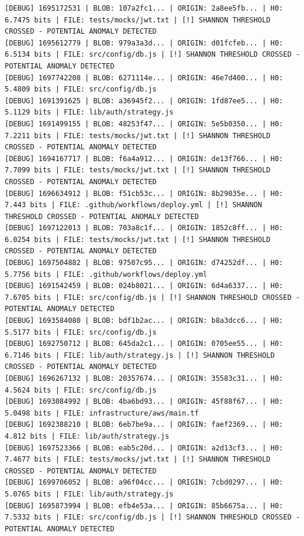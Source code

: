 \documentclass[12pt, a4paper, oneside]{report}
\begin{document}
\begin{lstlisting}[basicstyle=\tiny\ttfamily]
[DEBUG] 1695172531 | BLOB: 107a2fc1... | ORIGIN: 2a8ee5fb... | H0: 6.7475 bits | FILE: tests/mocks/jwt.txt | [!] SHANNON THRESHOLD CROSSED - POTENTIAL ANOMALY DETECTED
[DEBUG] 1695612779 | BLOB: 979a3a3d... | ORIGIN: d01fcfeb... | H0: 6.5134 bits | FILE: src/config/db.js | [!] SHANNON THRESHOLD CROSSED - POTENTIAL ANOMALY DETECTED
[DEBUG] 1697742208 | BLOB: 6271114e... | ORIGIN: 46e7d400... | H0: 5.4809 bits | FILE: src/config/db.js
[DEBUG] 1691391625 | BLOB: a36945f2... | ORIGIN: 1fd87ee5... | H0: 5.1129 bits | FILE: lib/auth/strategy.js
[DEBUG] 1691499155 | BLOB: 48253f47... | ORIGIN: 5e5b0350... | H0: 7.2211 bits | FILE: tests/mocks/jwt.txt | [!] SHANNON THRESHOLD CROSSED - POTENTIAL ANOMALY DETECTED
[DEBUG] 1694167717 | BLOB: f6a4a912... | ORIGIN: de13f766... | H0: 7.7099 bits | FILE: tests/mocks/jwt.txt | [!] SHANNON THRESHOLD CROSSED - POTENTIAL ANOMALY DETECTED
[DEBUG] 1696634912 | BLOB: f51cb53c... | ORIGIN: 8b29035e... | H0: 7.443 bits | FILE: .github/workflows/deploy.yml | [!] SHANNON THRESHOLD CROSSED - POTENTIAL ANOMALY DETECTED
[DEBUG] 1697122013 | BLOB: 703a8c1f... | ORIGIN: 1852c8ff... | H0: 6.0254 bits | FILE: tests/mocks/jwt.txt | [!] SHANNON THRESHOLD CROSSED - POTENTIAL ANOMALY DETECTED
[DEBUG] 1697504882 | BLOB: 97507c95... | ORIGIN: d74252df... | H0: 5.7756 bits | FILE: .github/workflows/deploy.yml
[DEBUG] 1691542459 | BLOB: 024b8021... | ORIGIN: 6d4a6337... | H0: 7.6705 bits | FILE: src/config/db.js | [!] SHANNON THRESHOLD CROSSED - POTENTIAL ANOMALY DETECTED
[DEBUG] 1693584080 | BLOB: bdf1b2ac... | ORIGIN: b8a3dcc6... | H0: 5.5177 bits | FILE: src/config/db.js
[DEBUG] 1692750712 | BLOB: 645da2c1... | ORIGIN: 0705ee55... | H0: 6.7146 bits | FILE: lib/auth/strategy.js | [!] SHANNON THRESHOLD CROSSED - POTENTIAL ANOMALY DETECTED
[DEBUG] 1696267132 | BLOB: 20357674... | ORIGIN: 35583c31... | H0: 4.5624 bits | FILE: src/config/db.js
[DEBUG] 1693084992 | BLOB: 4ba6bd93... | ORIGIN: 45f88f67... | H0: 5.0498 bits | FILE: infrastructure/aws/main.tf
[DEBUG] 1692388210 | BLOB: 6eb7be9a... | ORIGIN: faef2369... | H0: 4.812 bits | FILE: lib/auth/strategy.js
[DEBUG] 1697523366 | BLOB: eab5c20d... | ORIGIN: a2d13cf3... | H0: 7.4677 bits | FILE: tests/mocks/jwt.txt | [!] SHANNON THRESHOLD CROSSED - POTENTIAL ANOMALY DETECTED
[DEBUG] 1699706052 | BLOB: a96f04cc... | ORIGIN: 7cbd0297... | H0: 5.0765 bits | FILE: lib/auth/strategy.js
[DEBUG] 1695873994 | BLOB: efb4e53a... | ORIGIN: 85b6675a... | H0: 7.5332 bits | FILE: src/config/db.js | [!] SHANNON THRESHOLD CROSSED - POTENTIAL ANOMALY DETECTED
\end{lstlisting}
\end{document}
